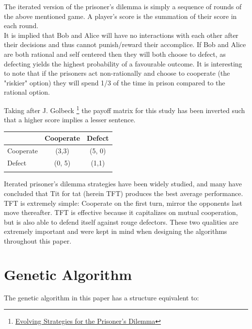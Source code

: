\documentclass[12pt]{article}
\begin{document}
The iterated version of the prisoner's dilemma is simply a sequence of rounds of
the above mentioned game.  A player's score is the summation of their score in
each round. \\

It is implied that Bob and Alice will have no interactions with each other after
their decisions and thus cannot punish/reward their accomplice. If Bob and Alice are
both rational and self centered then they will both choose to defect, as defecting
yields the highest probability of a favourable outcome.  It is interesting to note
that if the prisoners act non-rationally and choose to cooperate
(the "riskier" option) they will spend 1/3 of the time in prison compared
to the rational option. \\

\pagebreak

Taking after J. Golbeck
\footnote{\href{http://cgis.cs.umd.edu/~golbeck/downloads/JGolbeck\_prison.pdf}
{Evolving Strategies for the Prisoner's Dilemma}}
the payoff matrix for this study has been
inverted such that a higher score implies a lesser sentence. \\

\begin{center}
    \begin{tabular}{l | c | c}
         & Cooperate & Defect \\
        \hline
        Cooperate & (3,3) & (5, 0)\\
        \hline
        Defect & (0, 5) & (1,1) \\ \\
    \end{tabular}
\end{center}

Iterated prisoner's dilemma strategies have been widely studied, and many have
concluded that Tit for tat (herein TFT) produces the best average performance.
TFT is extremely simple: Cooperate on the first turn, mirror the opponents
last move thereafter.  TFT is effective because it capitalizes on mutual
cooperation, but is also able to defend itself against rouge defectors.  These
two qualities are extremely important and were kept in mind when designing the
algorithms throughout this paper.
\clearpage
\pagebreak

\section{Genetic Algorithm}

The genetic algorithm in this paper has a structure equivalent to: \\
\end{document}
